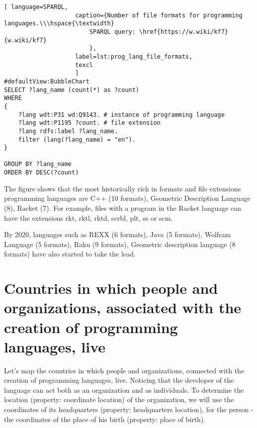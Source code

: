 \begin{lstlisting}[ language=SPARQL, 
                    caption={Number of file formats for programming languages.\\\hspace{\textwidth}
                        SPARQL query: \href{https://w.wiki/kf7}{w.wiki/kf7}
                        },
                    label=lst:prog_lang_file_formats,
                    texcl 
                    ]
#defaultView:BubbleChart
SELECT ?lang_name (count(*) as ?count)
WHERE
{
    ?lang wdt:P31 wd:Q9143. # instance of programming language
  	?lang wdt:P1195 ?count. # file extension
  	?lang rdfs:label ?lang_name.
    filter (lang(?lang_name) = "en").
}

GROUP BY ?lang_name 
ORDER BY DESC(?count)
\end{lstlisting}%

The figure shows that the most historically rich in formats and file extensions programming languages are C++ (10 formats), Geometric Description Language (8), Racket (7). For example, files with a program in the Racket language can have the extensions rkt, rktl, rktd, scrbl, plt, ss or scm.

By 2020, languages such as REXX (6 formats), Java (5 formats), Wolfram Language (5 formats), Raku (9 formats), Geometric description language (8 formats) have also started to take the lead.

\section{Countries in which people and organizations, associated with the creation of programming languages, live}

Let's map the countries in which people and organizations, connected with the creation of programming languages, live. Noticing that the developer of the language can act both as an organization and as individuals. To determine the location (property: coordinate location) of the organization, we will use the coordinates of its headquarters (property: headquarters location), for the person - the coordinates of the place of his birth (property: place of birth).


